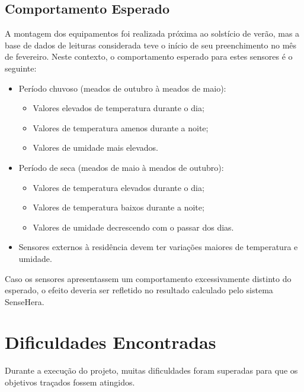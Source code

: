 \subsection{Comportamento Esperado}
\quad A montagem dos equipamentos foi realizada próxima ao solstício de verão, mas a base de dados de leituras considerada teve o início de seu preenchimento no mês de fevereiro. Neste contexto, o comportamento esperado para estes sensores é o seguinte:
\begin{itemize}
  \item Período chuvoso (meados de outubro à meados de maio):
  \begin{itemize}
    \item Valores elevados de temperatura durante o dia;
    \item Valores de temperatura amenos durante a noite;
    \item Valores de umidade mais elevados.

  \end{itemize}
  \item Período de seca (meados de maio à meados de outubro):
  \begin{itemize}
    \item Valores de temperatura elevados durante o dia;
    \item Valores de temperatura baixos durante a noite;
    \item Valores de umidade decrescendo com o passar dos dias.
  \end{itemize}
  \item Sensores externos à residência devem ter variações maiores de temperatura e umidade.
\end{itemize}
\null \quad Caso os sensores apresentassem um comportamento excessivamente distinto do esperado, o efeito deveria ser refletido no resultado calculado pelo sistema SenseHera.

\section{Dificuldades Encontradas}
\label{sec:dificuldades}
\quad Durante a execução do projeto, muitas dificuldades foram superadas para que os objetivos traçados fossem atingidos.

